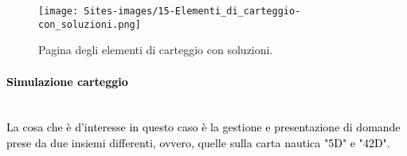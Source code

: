 \begin{figure}[h]
	\begin{center}
		\texttt{[image: Sites-images/15-Elementi\_di\_carteggio-con\_soluzioni.png]}
		\caption{Pagina degli elementi di carteggio con soluzioni.}
	\end{center}
\end{figure}

\paragraph{\textcolor{black}{Simulazione carteggio}}\leavevmode\\

\textcolor{black}{La cosa che è d'interesse in questo caso è la gestione e presentazione di domande prese da due insiemi differenti, ovvero, quelle sulla carta nautica "5D" e "42D".}\\ 

